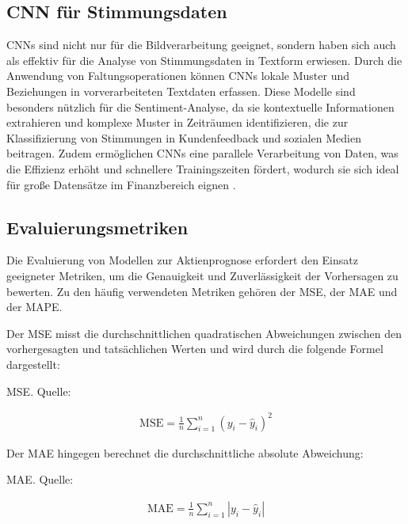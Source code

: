\subsection{\acs{CNN} für Stimmungsdaten}

\acp{CNN} sind nicht nur für die Bildverarbeitung geeignet, sondern haben sich auch als effektiv für die Analyse von Stimmungsdaten in Textform erwiesen. Durch die Anwendung von Faltungsoperationen können \acp{CNN} lokale Muster und Beziehungen in vorverarbeiteten Textdaten erfassen. Diese Modelle sind besonders nützlich für die Sentiment-Analyse, da sie kontextuelle Informationen extrahieren und komplexe Muster in Zeiträumen identifizieren, die zur Klassifizierung von Stimmungen in Kundenfeedback und sozialen Medien beitragen. Zudem ermöglichen \acp{CNN} eine parallele Verarbeitung von Daten, was die Effizienz erhöht und schnellere Trainingszeiten fördert, wodurch sie sich ideal für große Datensätze im Finanzbereich eignen \autocite{kim2014convolutional}\autocite{zhang2015sensitivity}.

\subsection{Evaluierungsmetriken}\label{sec:theorie_evalmetrics}

Die Evaluierung von Modellen zur Aktienprognose erfordert den Einsatz geeigneter Metriken, um die Genauigkeit und Zuverlässigkeit der Vorhersagen zu bewerten. Zu den häufig verwendeten Metriken gehören der \ac{MSE}, der \ac{MAE} und der \ac{MAPE}.

Der \ac{MSE} misst die durchschnittlichen quadratischen Abweichungen zwischen den vorhergesagten und tatsächlichen Werten und wird durch die folgende Formel dargestellt:

\begin{formel}[h]
	\caption{\ac{MSE}. Quelle: \autocite{davydenko2009mean}}
	\label{frm:mse}
	\begin{align}
	\text{MSE} = \frac{1}{n} \sum_{i=1}^{n} (y_i - \hat{y}_i)^2
	\end{align}
\end{formel}

Der \ac{MAE} hingegen berechnet die durchschnittliche absolute Abweichung:

\begin{formel}[h]
	\caption{\ac{MAE}. Quelle: \autocite{hyndman2006another}}
	\label{frm:MAE}
	\begin{align}
	\text{MAE} = \frac{1}{n} \sum_{i=1}^{n} |y_i - \hat{y}_i|
	\end{align}
\end{formel}

